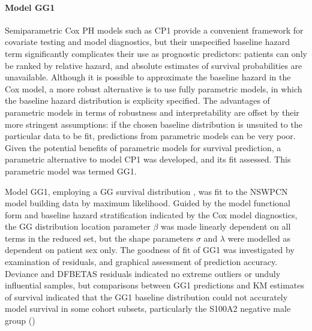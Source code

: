 \documentclass[dissertation.tex]{subfiles}
\begin{document}
\paragraph{Model GG1}
Semiparametric Cox \gls{PH} models such as CP1 provide a convenient framework for covariate testing and model diagnostics, but their unspecified baseline hazard term significantly complicates their use as prognostic predictors: patients can only be ranked by relative hazard, and absolute estimates of survival probabilities are unavailable.  Although it is possible to approximate the baseline hazard in the Cox model, a more robust alternative is to use fully parametric models, in which the baseline hazard distribution is explicity specified.  The advantages of parametric models in terms of robustness and interpretability are offset by their more stringent assumptions: if the chosen baseline distribution is unsuited to the particular data to be fit, predictions from parametric models can be very poor.  Given the potential benefits of parametric models for survival prediction, a parametric alternative to model CP1 was developed, and its fit assessed.  This parametric model was termed GG1.

Model GG1, employing a \gls{GG} survival distribution \cite{Cox2007}, was fit to the \gls{NSWPCN} model building data by maximum likelihood.  Guided by the model functional form and baseline hazard stratification indicated by the Cox model diagnostics, the \gls{GG} distribution location parameter $\beta$ was made linearly dependent on all terms in the reduced set, but the shape parameters $\sigma$ and $\lambda$ were modelled as dependent on patient sex only.  The goodness of fit of GG1 was investigated by examination of residuals, and graphical assessment of prediction accuracy.  Deviance and DFBETAS residuals indicated no extreme outliers or unduly influential samples, but comparisons between GG1 predictions and \gls{KM} estimates of survival indicated that the GG1 baseline distribution could not accurately model survival in some cohort subsets, particularly the S100A2 negative male group ()
\end{document}

